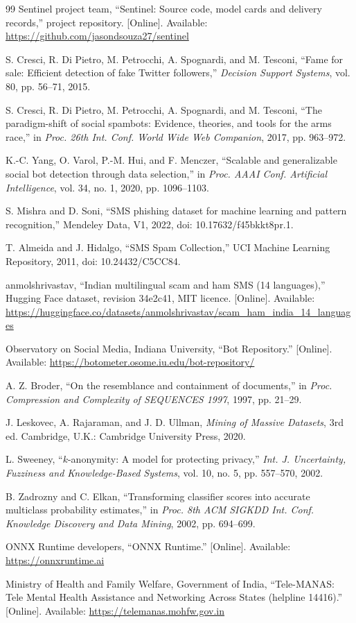 \begin{thebibliography}{99}
 Sentinel project team, ``Sentinel: Source code, model cards and delivery records,'' project repository. [Online]. Available: \url{https://github.com/jasondsouza27/sentinel}

 S. Cresci, R. Di Pietro, M. Petrocchi, A. Spognardi, and M. Tesconi, ``Fame for sale: Efficient detection of fake Twitter followers,'' \textit{Decision Support Systems}, vol. 80, pp. 56--71, 2015.

 S. Cresci, R. Di Pietro, M. Petrocchi, A. Spognardi, and M. Tesconi, ``The paradigm-shift of social spambots: Evidence, theories, and tools for the arms race,'' in \textit{Proc. 26th Int. Conf. World Wide Web Companion}, 2017, pp. 963--972.

 K.-C. Yang, O. Varol, P.-M. Hui, and F. Menczer, ``Scalable and generalizable social bot detection through data selection,'' in \textit{Proc. AAAI Conf. Artificial Intelligence}, vol. 34, no. 1, 2020, pp. 1096--1103.

 S. Mishra and D. Soni, ``SMS phishing dataset for machine learning and pattern recognition,'' Mendeley Data, V1, 2022, doi: 10.17632/f45bkkt8pr.1.

 T. Almeida and J. Hidalgo, ``SMS Spam Collection,'' UCI Machine Learning Repository, 2011, doi: 10.24432/C5CC84.

 anmolshrivastav, ``Indian multilingual scam and ham SMS (14 languages),'' Hugging Face dataset, revision 34e2c41, MIT licence. [Online]. Available: \url{https://huggingface.co/datasets/anmolshrivastav/scam_ham_india_14_languages}

 Observatory on Social Media, Indiana University, ``Bot Repository.'' [Online]. Available: \url{https://botometer.osome.iu.edu/bot-repository/}

 A. Z. Broder, ``On the resemblance and containment of documents,'' in \textit{Proc. Compression and Complexity of SEQUENCES 1997}, 1997, pp. 21--29.

 J. Leskovec, A. Rajaraman, and J. D. Ullman, \textit{Mining of Massive Datasets}, 3rd ed. Cambridge, U.K.: Cambridge University Press, 2020.

 L. Sweeney, ``$k$-anonymity: A model for protecting privacy,'' \textit{Int. J. Uncertainty, Fuzziness and Knowledge-Based Systems}, vol. 10, no. 5, pp. 557--570, 2002.

 B. Zadrozny and C. Elkan, ``Transforming classifier scores into accurate multiclass probability estimates,'' in \textit{Proc. 8th ACM SIGKDD Int. Conf. Knowledge Discovery and Data Mining}, 2002, pp. 694--699.

 ONNX Runtime developers, ``ONNX Runtime.'' [Online]. Available: \url{https://onnxruntime.ai}

 Ministry of Health and Family Welfare, Government of India, ``Tele-MANAS: Tele Mental Health Assistance and Networking Across States (helpline 14416).'' [Online]. Available: \url{https://telemanas.mohfw.gov.in}

\end{thebibliography}
